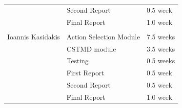 \documentclass[a4paper,11pt]{article}
\begin{document}
\begin{table}[h]
\begin{tabular}{|l|l|l|}
&  Second Report&  0.5 week  \\ \cline{1-3}
&  Final Report&  1.0 week  \\ \cline{1-3}
&  &   \\ \cline{1-3}
Ioannis Kasidakis& Action Selection Module& 7.5 weeks  \\ \cline{1-3}
&  CSTMD module& 3.5 weeks    \\ \cline{1-3}
& Testing& 0.5 weeks \\ \cline{1-3}
&  First Report& 0.5 week     \\ \cline{1-3}
&  Second Report& 0.5 week   \\ \cline{1-3}
&  Final Report& 1.0 week   \\ \cline{1-3}

\end{tabular}
\end{table}
\end{document}
